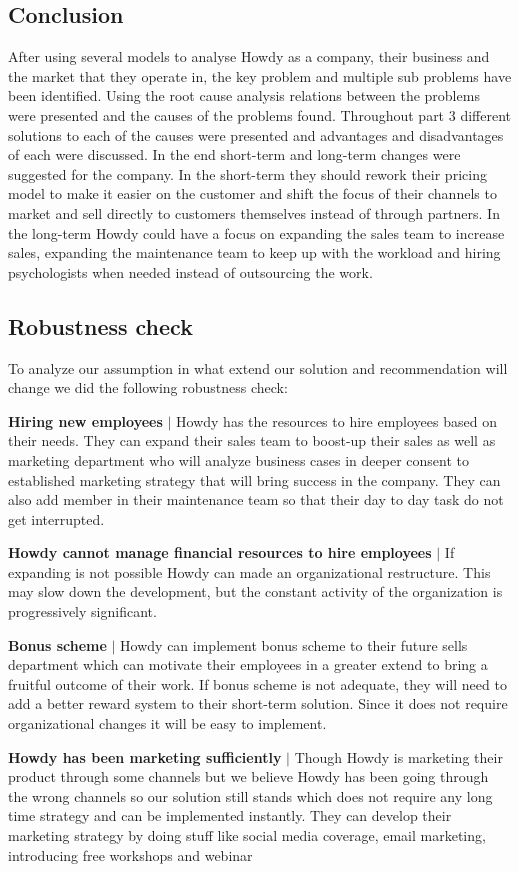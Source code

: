 \subsection{Conclusion}
After using several models to analyse Howdy as a company, their business and the market that they operate in, the key problem and multiple sub problems have been identified. Using the root cause analysis relations between the problems were presented and the causes of the problems found. Throughout part 3 different solutions to each of the causes were presented and advantages and disadvantages of each were discussed. In the end short-term and long-term changes were suggested for the company. In the short-term they should rework their pricing model to make it easier on the customer and shift the focus of their channels to market and sell directly to customers themselves instead of through partners. In the long-term Howdy could have a focus on expanding the sales team to increase sales, expanding the maintenance team to keep up with the workload and hiring psychologists when needed instead of outsourcing the work.

\subsection{Robustness check}

To analyze our assumption in what extend our solution and recommendation will change we did the following robustness check:

\noindent\textbf{Hiring new employees} $|$ Howdy has the resources to hire employees based on their needs. They can expand their sales team to boost-up their sales as well as marketing department who will analyze business cases in deeper consent to established marketing strategy that will bring success in the company. They can also add member in their maintenance team so that their day to day task do not get interrupted.

\noindent \textbf{Howdy cannot manage financial resources to hire employees} $|$ If expanding is not possible Howdy can made an organizational restructure. This may slow down the development, but the constant activity of the organization is progressively significant.

\noindent \textbf{Bonus scheme} $|$ Howdy can implement bonus scheme to their future sells department which can motivate their employees in a greater extend to bring a fruitful outcome of their work. If bonus scheme is not adequate, they will need to add a better reward system to their short-term solution. Since it does not require organizational changes it will be easy to implement.

\noindent \textbf{Howdy has been marketing sufficiently} $|$ Though Howdy is marketing their product through some channels but we believe Howdy has been going through the wrong channels so our solution still stands which does not require any long time strategy and can be implemented instantly. They can develop their marketing strategy by doing stuff like social media coverage, email marketing, introducing free workshops and webinar
